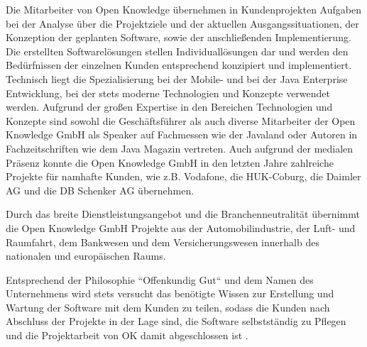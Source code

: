 Die Mitarbeiter von Open Knowledge übernehmen in Kundenprojekten Aufgaben bei der Analyse über die Projektziele und der aktuellen Ausgangssituationen, der Konzeption der geplanten Software, sowie der anschließenden Implementierung. Die erstellten Softwarelösungen stellen Individuallösungen dar und werden den Bedürfnissen der einzelnen Kunden entsprechend konzipiert und implementiert. Technisch liegt die Spezialisierung bei der Mobile- und bei der Java Enterprise Entwicklung, bei der stets moderne Technologien und Konzepte verwendet werden. Aufgrund der großen Expertise in den Bereichen Technologien und Konzepte sind sowohl die Geschäftsführer als auch diverse Mitarbeiter der Open Knowledge GmbH als Speaker auf Fachmessen wie der Javaland oder Autoren in Fachzeitschriften wie dem Java Magazin vertreten. Auch aufgrund der medialen Präsenz konnte die Open Knowledge GmbH in den letzten Jahre zahlreiche Projekte für namhafte Kunden, wie z.B. Vodafone, die HUK-Coburg, die Daimler AG und die DB Schenker AG übernehmen.  \cite{VincentOpenKnowledge}

Durch das breite Dienstleistungsangebot und die Branchenneutralität übernimmt die Open Knowledge GmbH Projekte aus der Automobilindustrie, der Luft- und Raumfahrt, dem Bankwesen und dem Versicherungswesen innerhalb des nationalen und europäischen Raums.

Entsprechend der Philosophie ``Offenkundig Gut`` und dem Namen des Unternehmens wird stets versucht das benötigte Wissen zur Erstellung und Wartung der Software mit dem Kunden zu teilen, sodass die Kunden nach Abschluss der Projekte in der Lage sind, die Software selbstständig zu Pflegen und die Projektarbeit von OK damit abgeschlossen ist \cite{OpenKnowledgePhilosophie}.
